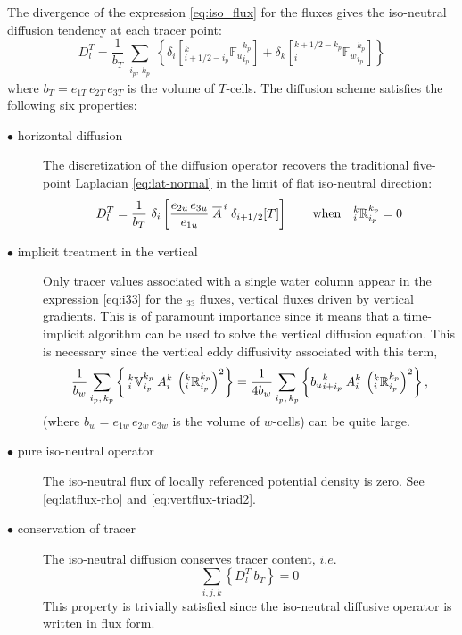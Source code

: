 \documentclass[../main/NEMO_manual]{subfiles}
\begin{document}
The divergence of the expression \autoref{eq:iso_flux} for the fluxes gives the iso-neutral diffusion tendency at
each tracer point:
\[
  D_l^T = \frac{1}{b_T}
  \sum_{\substack{i_p,\,k_p}} \left\{ \delta_{i} \left[{_{i+1/2-i_p}^k
        {\mathbb{F}_u }_{i_p}^{k_p}} \right] + \delta_{k} \left[
      {_i^{k+1/2-k_p} {\mathbb{F}_w}_{i_p}^{k_p}} \right] \right\}
\]
where $b_T= e_{1T}\,e_{2T}\,e_{3T}$ is the volume of $T$-cells.
The diffusion scheme satisfies the following six properties:
\begin{description}
\item[$\bullet$ horizontal diffusion]
  The discretization of the diffusion operator recovers the traditional five-point Laplacian
  \autoref{eq:lat-normal} in the limit of flat iso-neutral direction:
  \[
    D_l^T = \frac{1}{b_T} \
    \delta_{i} \left[ \frac{e_{2u}\,e_{3u}}{e_{1u}} \;
      \overline{{A}}^{\,i} \; \delta_{i+1/2}[T] \right] \qquad
    \text{when} \quad { _i^k \mathbb{R}_{i_p}^{k_p} }=0
  \]

\item[$\bullet$ implicit treatment in the vertical]
  Only tracer values associated with a single water column appear in the expression \autoref{eq:i33} for
  the $_{33}$ fluxes, vertical fluxes driven by vertical gradients.
  This is of paramount importance since it means that a time-implicit algorithm can be used to
  solve the vertical diffusion equation.
  This is necessary since the vertical eddy diffusivity associated with this term,
  \[
    \frac{1}{b_w}\sum_{\substack{i_p, \,k_p}} \left\{
      {\:}_i^k\mathbb{V}_{i_p}^{k_p} \: {A}_i^k \: \left(_i^k \mathbb{R}_{i_p}^{k_p}\right)^2
    \right\}  =
    \frac{1}{4b_w}\sum_{\substack{i_p, \,k_p}} \left\{
      {b_u}_{i+i_p}^k\: {A}_i^k \: \left(_i^k \mathbb{R}_{i_p}^{k_p}\right)^2
    \right\},
  \]
  (where $b_w= e_{1w}\,e_{2w}\,e_{3w}$ is the volume of $w$-cells) can be quite large.

\item[$\bullet$ pure iso-neutral operator]
  The iso-neutral flux of locally referenced potential density is zero.
  See \autoref{eq:latflux-rho} and \autoref{eq:vertflux-triad2}.

\item[$\bullet$ conservation of tracer]
  The iso-neutral diffusion conserves tracer content, $i.e.$
  \[
    \sum_{i,j,k} \left\{ D_l^T \      b_T \right\} = 0
  \]
  This property is trivially satisfied since the iso-neutral diffusive operator is written in flux form.


\end{description}
\end{document}
